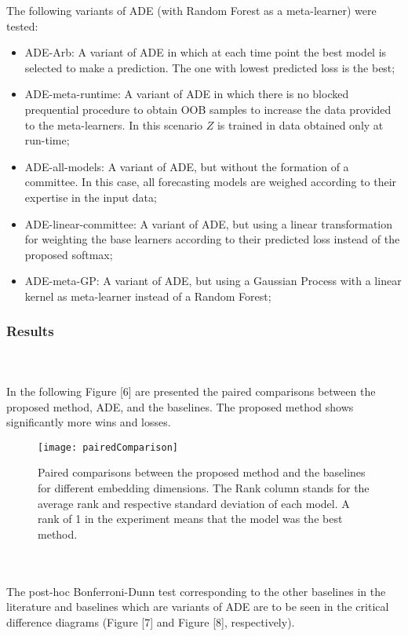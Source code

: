 \documentclass[runningheads,a4paper]{llncs}[2015/06/24]
\begin{document}
The following variants of ADE (with Random Forest as a meta-learner) were tested:
\begin{itemize}
\item ADE-Arb: A variant of ADE in which at each time point the best model is selected to make a prediction. The one with lowest predicted loss is the best;
\item ADE-meta-runtime: A variant of ADE in which there is no blocked prequential procedure to obtain OOB samples to increase the data provided to the meta-learners. In this scenario $Z$ is trained in data obtained only at run-time;
\item ADE-all-models: A variant of ADE, but without the formation of a committee. In this case, all forecasting models are weighed according to their expertise in the input data;
\item ADE-linear-committee: A variant of ADE, but using a linear transformation for weighting the base learners according to their predicted loss instead of the proposed softmax;
\item ADE-meta-GP: A variant of ADE, but using a Gaussian Process with a linear kernel as meta-learner instead of a Random Forest;
\end{itemize}
\subsubsection{Results}
\hspace{1cm}\\\\ In the following Figure [6] are presented the paired comparisons between the proposed method, ADE, and the baselines. The proposed method shows significantly more wins and losses. 

\begin{figure}[h]
\centering
\texttt{[image: pairedComparison]}
\caption{Paired comparisons between the proposed method and the baselines for different embedding dimensions. The Rank column stands for the average rank and respective standard deviation of each model. A rank of 1 in the
experiment means that the model was the best method.}
\label{fig:paired comparison}
\end{figure}

\hspace{1cm}\\\\ The post-hoc Bonferroni-Dunn test corresponding to the other baselines in the literature and baselines which are variants of ADE are to be seen in the critical difference diagrams (Figure [7] and Figure [8], respectively).
\end{document}
